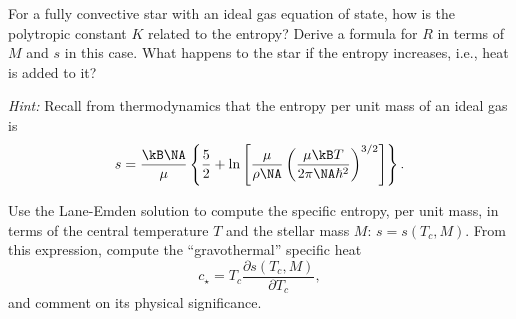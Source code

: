 \begin{exercisebox}
\label{p.radius-entropy} For a fully convective star with an ideal gas equation of state, how is the polytropic constant $K$ related to the entropy? Derive a formula for $R$ in terms of $M$ and $s$ in this case.  What happens to the star if the entropy increases, i.e., heat is added to it?

\emph{Hint:} Recall from thermodynamics that the entropy per unit mass of an ideal gas is
\begin{equation}\label{e.exercise-entropy}
s = \frac{\kB \NA}{\mu}\left\{ \frac{5}{2} + \ln\left[\frac{\mu}{\rho\NA}\left(\frac{\mu\kB T}{2\pi\NA\hbar^{2}}\right)^{3/2}\right]\right\}.
\end{equation}

Use the Lane-Emden solution to compute the specific entropy, per unit mass, in terms of the central temperature $T$ and the stellar mass $M$: $s = s(T_{c},M)$.  From this expression,  compute the ``gravothermal'' specific heat
\begin{equation}\label{e.cstar}
c_{\star} = T_{c}\frac{\partial s(T_{c},M)}{\partial T_{c}},
\end{equation}
and comment on its physical significance.
\end{exercisebox}



